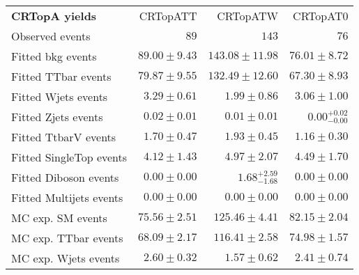 

\begin{table}
\begin{center}
\setlength{\tabcolsep}{0.0pc}
{\small
\begin{tabular*}{\textwidth}{@{\extracolsep{\fill}}lrrr}
\noalign{\smallskip}\hline\noalign{\smallskip}
{\bf CRTopA yields}           & CRTopATT            & CRTopATW            & CRTopAT0              \\[-0.05cm]
\noalign{\smallskip}\hline\noalign{\smallskip}
Observed events          & $89$              & $143$              & $76$                    \\
\noalign{\smallskip}\hline\noalign{\smallskip}
Fitted bkg events         & $89.00 \pm 9.43$          & $143.08 \pm 11.98$          & $76.01 \pm 8.72$              \\
\noalign{\smallskip}\hline\noalign{\smallskip}
        Fitted TTbar events         & $79.87 \pm 9.55$          & $132.49 \pm 12.60$          & $67.30 \pm 8.93$              \\
        Fitted Wjets events         & $3.29 \pm 0.61$          & $1.99 \pm 0.86$          & $3.06 \pm 1.00$              \\
        Fitted Zjets events         & $0.02 \pm 0.01$          & $0.01 \pm 0.01$          & $0.00_{-0.00}^{+0.02}$              \\
        Fitted TtbarV events         & $1.70 \pm 0.47$          & $1.93 \pm 0.45$          & $1.16 \pm 0.30$              \\
        Fitted SingleTop events         & $4.12 \pm 1.43$          & $4.97 \pm 2.07$          & $4.49 \pm 1.70$              \\
        Fitted Diboson events         & $0.00 \pm 0.00$          & $1.68_{-1.68}^{+2.59}$          & $0.00 \pm 0.00$              \\
        Fitted Multijets events         & $0.00 \pm 0.00$          & $0.00 \pm 0.00$          & $0.00 \pm 0.00$              \\
 \noalign{\smallskip}\hline\noalign{\smallskip}
MC exp. SM events              & $75.56 \pm 2.51$          & $125.46 \pm 4.41$          & $82.15 \pm 2.04$              \\
\noalign{\smallskip}\hline\noalign{\smallskip}
        MC exp. TTbar events         & $68.09 \pm 2.17$          & $116.41 \pm 2.58$          & $74.98 \pm 1.57$              \\
        MC exp. Wjets events         & $2.60 \pm 0.32$          & $1.57 \pm 0.62$          & $2.41 \pm 0.74$              \\

\end{tabular*}}
\end{center}
\end{table}
